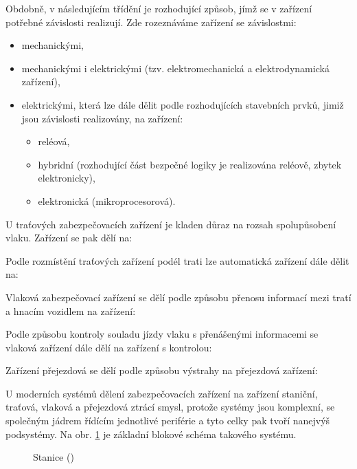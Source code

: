 {  Obdobně, v následujícím třídění je rozhodující způsob, jímž se v zařízení potřebné závislosti
  realizují. Zde rozeznáváme zařízení se závislostmi:
  \begin{itemize}[noitemsep]
    \item mechanickými,
    \item mechanickými i elektrickými (tzv. elektromechanická a elektrodynamická zařízení),
    \item elektrickými, která lze dále dělit podle rozhodujících stavebních prvků, jimiž jsou 
         závislosti realizovány, na zařízení:
       \begin{itemize}
       \item reléová,
       \item hybridní (rozhodující část bezpečné logiky je realizována reléově, zbytek 
             elektronicky),
       \item elektronická (mikroprocesorová). 
       \end{itemize}
  \end{itemize}

  U traťových zabezpečovacích zařízení je kladen důraz na rozsah spolupůsobení vlaku. Zařízení se
  pak dělí na:
  \begin{center}
  \end{center}
  Podle rozmístění traťových zařízení podél trati lze automatická zařízení dále dělit na:
  \begin{center}
  \end{center}
  Vlaková zabezpečovací zařízení se dělí podle způsobu přenosu informací mezi tratí a hnacím
  vozidlem na zařízení:
  \begin{center}
  \end{center}

  Podle způsobu kontroly souladu jízdy vlaku s přenášenými informacemi se vlaková zařízení dále 
  dělí na zařízení s kontrolou:
  \begin{center}
  \end{center}
  
  Zařízení přejezdová se dělí podle způsobu výstrahy na přejezdová zařízení:
  \begin{center}
  \end{center}
  
  U moderních systémů dělení zabezpečovacích zařízení na zařízení staniční, traťová, vlaková a
  přejezdová ztrácí smysl, protože systémy jsou komplexní, se společným jádrem řídícím jednotlivé 
  periférie a tyto celky pak tvoří nanejvýš podsystémy. Na obr. \ref{zzt:fig003} je základní 
  blokové schéma takového systému. 
  \begin{figure}[ht!] %
    \centering
    \caption{Stanice (\cite[s.~11]{Chudacek2005})}
    \label{zzt:fig003}
  \end{figure}


}
